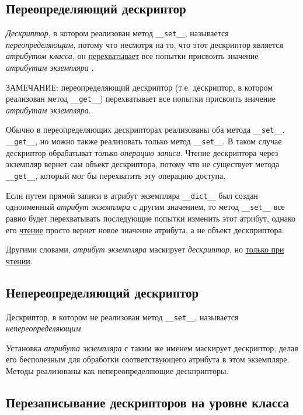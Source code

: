 \documentclass[%
	11pt,
	a4paper,
	utf8,
		]{article}
\begin{document}
\subsection{Переопределяющий дескриптор}

\emph{Дескриптор}, в котором реализован метод \texttt{\_\_set\_\_}, называется \emph{переопределяющим}, потому что несмотря на то, что этот дескриптор является \emph{атрибутом класса}, он \underline{перехватывает} все попытки присвоить значение \emph{атрибутам экземпляра} \cite[]{ramalho:python-2016}.

ЗАМЕЧАНИЕ: переопределяющий дескриптор (т.е. дескриптор, в котором реализован метод \verb|__get__|) перехватывает все попытки присвоить значение \emph{атрибутам экземпляра}.

Обычно в переопределяющих дескрипторах реализованы оба метода \verb|__set__|, \verb|__get__|, но можно также реализовать только метод \verb|__set__|. В таком случае дескриптор обрабатыват только \emph{операцию записи}. Чтение дескриптора через экземпляр вернет сам объект дескриптора, потому что не существует метода \verb|__get__|, который мог бы перехватить эту операцию доступа.

Если путем прямой записи в атрибут экземпляра \verb|__dict__| был создан одноименный \emph{атрибут экземпляра} с другим значением, то метод \verb|__set__| все равно будет перехватывать последующие попытки изменить этот атрибут, однако его \underline{чтение} просто вернет новое значение атрибута, а не объект дескприптора.

Другими словами, \emph{атрибут экземпляра} маскирует \emph{дескриптор}, но \underline{только при чтении}.

\subsection{Непереопределяющий дескриптор}

Дескриптор, в котором не реализован метод \verb|__set__|, называется \emph{непереопределяющим}.

Установка \emph{атрибута экземпляра} с таким же именем маскирует дескриптор, делая его бесполезным для обработки соответствующего атрибута в этом экземпляре. Методы реализованы как непереопределяющие дескприпторы.

\subsection{Перезаписывание дескрипторов на уровне класса}
\end{document}
